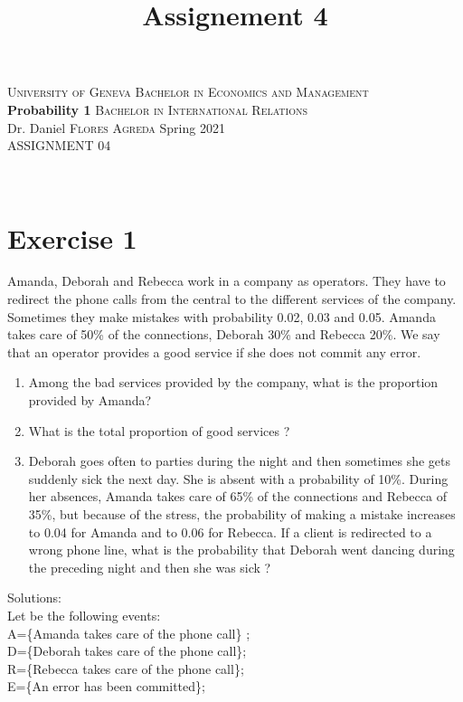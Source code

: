 \documentclass[12pt,thmsa]{article}\usepackage[]{graphicx}\usepackage[]{color}
\title{Assignement 4}
\begin{document}
\noindent \textsc{University of Geneva}     \hfill \textsc{Bachelor in Economics and Management} \\
\textbf{Probability 1}                      \hfill \textsc{Bachelor in International Relations} \\
Dr. Daniel \textsc{Flores Agreda}                 \hfill Spring 2021  \\
ASSIGNMENT 04



\noindent
\makebox[\linewidth]{\rule{\textwidth}{0.4pt}}\\[1.5ex]

\section*{Exercise 1}

Amanda, Deborah and Rebecca work in a company as operators. They have to redirect the phone calls from the central to the different services of the company. Sometimes they make mistakes with
probability 0.02, 0.03 and 0.05. Amanda takes care of 50\% of the connections, Deborah 30\% and Rebecca 20\%. We say that an operator provides a good service if she does not commit any error.

\begin{enumerate}
  \item Among the bad services provided by the company, what is the proportion provided by Amanda?
  \item What is the total proportion of good services ?
  \item
  Deborah goes often to parties during the night and then sometimes she gets suddenly sick the next day. She is absent with a probability of 10\%.
  During her absences, Amanda takes care of 65\% of the connections and Rebecca of 35\%, but because of the stress, the probability of making a mistake
  increases to 0.04 for Amanda and to 0.06 for Rebecca. If a client is redirected to a wrong phone line, what is the probability that Deborah went dancing during the preceding night and then she was sick ?
\end{enumerate}

\noindent Solutions:\\
Let be the following events: \\
A=\{Amanda takes care of the phone call\} ; \\
D=\{Deborah takes care of the phone call\}; \\
R=\{Rebecca takes care of the phone call\}; \\
E=\{An error has been committed\}; \\
\end{document}
